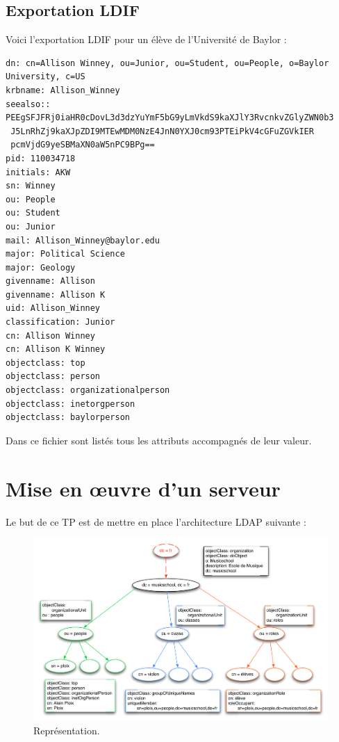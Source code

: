 \documentclass[12pt,a4paper,notitlepage]{article}
\begin{document}
\subsection{Exportation LDIF}

Voici l'exportation LDIF pour un élève de l'Université de Baylor :\\
\begin{lstlisting}[title=Export LDIF d'une entrée élève]
dn: cn=Allison Winney, ou=Junior, ou=Student, ou=People, o=Baylor University, c=US
krbname: Allison_Winney
seealso:: PEEgSFJFRj0iaHR0cDovL3d3dzYuYmF5bG9yLmVkdS9kaXJlY3RvcnkvZGlyZWN0b3
 J5LnRhZj9kaXJpZDI9MTEwMDM0NzE4JnN0YXJ0cm93PTEiPkV4cGFuZGVkIER
 pcmVjdG9yeSBMaXN0aW5nPC9BPg==
pid: 110034718
initials: AKW
sn: Winney
ou: People
ou: Student
ou: Junior
mail: Allison_Winney@baylor.edu
major: Political Science
major: Geology
givenname: Allison
givenname: Allison K
uid: Allison_Winney
classification: Junior
cn: Allison Winney
cn: Allison K Winney
objectclass: top
objectclass: person
objectclass: organizationalperson
objectclass: inetorgperson
objectclass: baylorperson
\end{lstlisting}

Dans ce fichier sont listés tous les attributs accompagnés de leur valeur.

\clearpage
\section{Mise en \oe uvre d'un serveur}

Le but de ce TP est de mettre en place l'architecture LDAP suivante :
\begin{figure}[!h]
\begin{center}
\includegraphics[scale=0.64]{tpldap}
\caption{Représentation.}
\end{center}
\end{figure}
\end{document}

